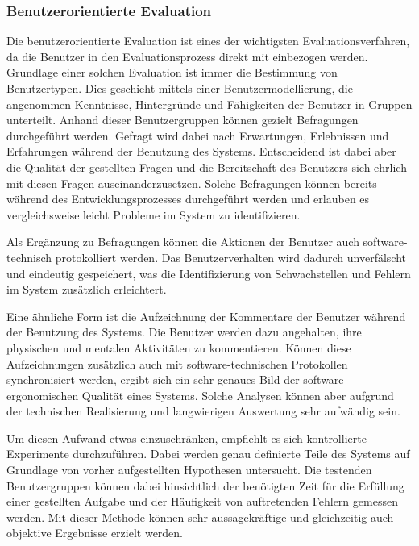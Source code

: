 \subsubsection{Benutzerorientierte Evaluation}

Die benutzerorientierte Evaluation ist eines der wichtigsten Evaluationsverfahren, da die Benutzer in den Evaluationsprozess direkt mit einbezogen werden. Grundlage einer solchen Evaluation ist immer die Bestimmung von Benutzertypen. Dies geschieht mittels einer Benutzermodellierung, die angenommen Kenntnisse, Hintergründe und Fähigkeiten der Benutzer in Gruppen unterteilt. Anhand dieser Benutzergruppen können gezielt Befragungen durchgeführt werden. Gefragt wird dabei nach Erwartungen, Erlebnissen und Erfahrungen während der Benutzung des Systems. Entscheidend ist dabei aber die Qualität der gestellten Fragen und die Bereitschaft des Benutzers sich ehrlich mit diesen Fragen auseinanderzusetzen. Solche Befragungen können bereits während des Entwicklungsprozesses durchgeführt werden und erlauben es vergleichsweise leicht Probleme im System zu identifizieren. \parencite[vgl.][215]{Herczeg2009}

Als Ergänzung zu Befragungen können die Aktionen der Benutzer auch software-technisch protokolliert werden. Das Benutzerverhalten wird dadurch unverfälscht und eindeutig gespeichert, was die Identifizierung von Schwachstellen und Fehlern im System zusätzlich erleichtert.

Eine ähnliche Form ist die Aufzeichnung der Kommentare der Benutzer während der Benutzung des Systems. Die Benutzer werden dazu angehalten, ihre physischen und mentalen Aktivitäten zu kommentieren. Können diese Aufzeichnungen zusätzlich auch mit software-technischen Protokollen synchronisiert werden, ergibt sich ein sehr genaues Bild der software-ergonomischen Qualität eines Systems. \parencite[vgl.][216]{Herczeg2009} Solche Analysen können aber aufgrund der technischen Realisierung und langwierigen Auswertung sehr aufwändig sein.

Um diesen Aufwand etwas einzuschränken, empfiehlt es sich kontrollierte Experimente durchzuführen. Dabei werden genau definierte Teile des Systems auf Grundlage von vorher aufgestellten Hypothesen untersucht. Die testenden Benutzergruppen können dabei hinsichtlich der benötigten Zeit für die Erfüllung einer gestellten Aufgabe und der Häufigkeit von auftretenden Fehlern gemessen werden. \parencite[vgl.][216]{Herczeg2009} Mit dieser Methode können sehr aussagekräftige und gleichzeitig auch objektive Ergebnisse erzielt werden.


